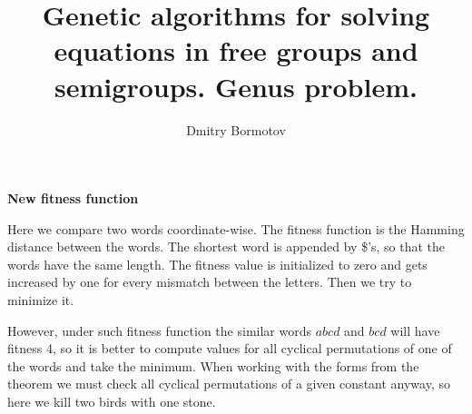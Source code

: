 \documentclass{slides}
\title{Genetic algorithms for solving
equations in free groups and semigroups.  Genus problem.}
\author{Dmitry Bormotov} \date{}
\begin{document}
\pagestyle{empty}

\begin{center} \Large\textbf{New fitness function} \end{center}

Here we compare two words coordinate-wise. The fitness function is the
Hamming distance between the words. The shortest word is appended by
\$'s, so that the words have the same length. The fitness value is
initialized to zero and gets increased by one for every mismatch
between the letters. Then we try to minimize it.

However, under such fitness function the similar words $a b c d$ and
$b c d$ will have fitness 4, so it is better to compute values for all
cyclical permutations of one of the words and take the minimum. When
working with the forms from the theorem we must check all cyclical
permutations of a given constant anyway, so here we kill two birds
with one stone.
\end{document}

